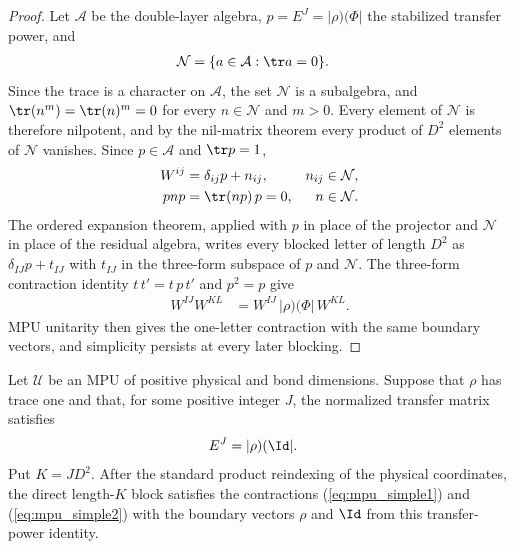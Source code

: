 \begin{proof}\leanok
    Let $\mathcal A$ be the double-layer algebra, $p=E^J=|\rho)(\Phi|$ the
    stabilized transfer power, and
    \begin{align}
        \mathcal N & =\{a\in\mathcal A:\tr a=0\}.
    \end{align}
    Since the trace is a character on $\mathcal A$, the set $\mathcal N$ is
    a subalgebra, and $\tr(n^m)=\tr(n)^m=0$ for every $n\in\mathcal N$ and
    $m>0$.  Every element of $\mathcal N$ is therefore nilpotent, and by the
    nil-matrix theorem every product of $D^2$ elements of $\mathcal N$
    vanishes.  Since $p\in\mathcal A$ and $\tr p=1$,
    \begin{align}
        W^{ij} & =\delta_{ij}p+n_{ij},
               & n_{ij}                & \in\mathcal N, \\
        pnp    & =\tr(np)\,p=0,
               & n                     & \in\mathcal N.
    \end{align}
    The ordered expansion theorem, applied with $p$ in place of the projector
    and $\mathcal N$ in place of the residual algebra, writes every blocked
    letter of length $D^2$ as $\delta_{IJ}p+t_{IJ}$ with $t_{IJ}$ in the
    three-form subspace of $p$ and $\mathcal N$.  The three-form contraction
    identity $t\,t'=t\,p\,t'$ and $p^2=p$ give
    \begin{align}
        W^{IJ}W^{KL} & =W^{IJ}\,|\rho)(\Phi|\,W^{KL}.
    \end{align}
    MPU unitarity then gives the one-letter contraction with the same
    boundary vectors, and simplicity persists at every later blocking.
\end{proof}

\begin{lemma}
    \label{thm:mpu_matching_direct_block_contractions}
    \leanok
    Let $\mathcal U$ be an MPU of positive physical and bond dimensions.
    Suppose that $\rho$ has trace one and that, for some positive integer $J$,
    the normalized transfer matrix satisfies
    \begin{align}
        E^J & =|\rho)(\Id|.
    \end{align}
    Put $K=JD^2$. After the standard product reindexing of the physical
    coordinates, the direct length-$K$ block satisfies the contractions
    (\ref{eq:mpu_simple1}) and (\ref{eq:mpu_simple2}) with the boundary vectors
    $\rho$ and $\Id$ from this transfer-power identity.
\end{lemma}

